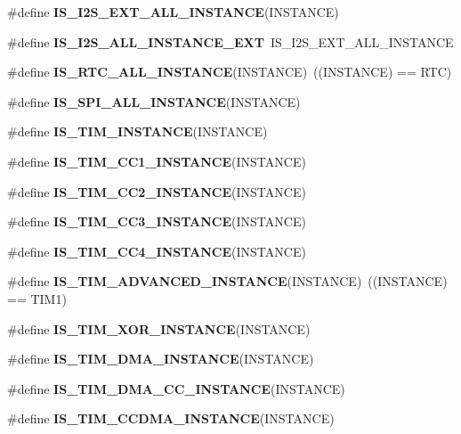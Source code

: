 \begin{DoxyCompactItemize}
\#define {\bfseries I\+S\+\_\+\+I2\+S\+\_\+\+E\+X\+T\+\_\+\+A\+L\+L\+\_\+\+I\+N\+S\+T\+A\+N\+CE}(I\+N\+S\+T\+A\+N\+CE)
\item 
\mbox{\label{group___exported__macros_ga839b019f23ec240da66dd50a21ab5025}} 
\#define {\bfseries I\+S\+\_\+\+I2\+S\+\_\+\+A\+L\+L\+\_\+\+I\+N\+S\+T\+A\+N\+C\+E\+\_\+\+E\+XT}~I\+S\+\_\+\+I2\+S\+\_\+\+E\+X\+T\+\_\+\+A\+L\+L\+\_\+\+I\+N\+S\+T\+A\+N\+CE
\item 
\mbox{\label{group___exported__macros_gab4230e8bd4d88adc4250f041d67375ce}} 
\#define {\bfseries I\+S\+\_\+\+R\+T\+C\+\_\+\+A\+L\+L\+\_\+\+I\+N\+S\+T\+A\+N\+CE}(I\+N\+S\+T\+A\+N\+CE)~((I\+N\+S\+T\+A\+N\+CE) == R\+TC)
\item 
\#define {\bfseries I\+S\+\_\+\+S\+P\+I\+\_\+\+A\+L\+L\+\_\+\+I\+N\+S\+T\+A\+N\+CE}(I\+N\+S\+T\+A\+N\+CE)
\item 
\#define {\bfseries I\+S\+\_\+\+T\+I\+M\+\_\+\+I\+N\+S\+T\+A\+N\+CE}(I\+N\+S\+T\+A\+N\+CE)
\item 
\#define {\bfseries I\+S\+\_\+\+T\+I\+M\+\_\+\+C\+C1\+\_\+\+I\+N\+S\+T\+A\+N\+CE}(I\+N\+S\+T\+A\+N\+CE)
\item 
\#define {\bfseries I\+S\+\_\+\+T\+I\+M\+\_\+\+C\+C2\+\_\+\+I\+N\+S\+T\+A\+N\+CE}(I\+N\+S\+T\+A\+N\+CE)
\item 
\#define {\bfseries I\+S\+\_\+\+T\+I\+M\+\_\+\+C\+C3\+\_\+\+I\+N\+S\+T\+A\+N\+CE}(I\+N\+S\+T\+A\+N\+CE)
\item 
\#define {\bfseries I\+S\+\_\+\+T\+I\+M\+\_\+\+C\+C4\+\_\+\+I\+N\+S\+T\+A\+N\+CE}(I\+N\+S\+T\+A\+N\+CE)
\item 
\mbox{\label{group___exported__macros_ga7e85353dbe9dc9d80ad06f0b935c12e1}} 
\#define {\bfseries I\+S\+\_\+\+T\+I\+M\+\_\+\+A\+D\+V\+A\+N\+C\+E\+D\+\_\+\+I\+N\+S\+T\+A\+N\+CE}(I\+N\+S\+T\+A\+N\+CE)~((I\+N\+S\+T\+A\+N\+CE) == T\+I\+M1)
\item 
\#define {\bfseries I\+S\+\_\+\+T\+I\+M\+\_\+\+X\+O\+R\+\_\+\+I\+N\+S\+T\+A\+N\+CE}(I\+N\+S\+T\+A\+N\+CE)
\item 
\#define {\bfseries I\+S\+\_\+\+T\+I\+M\+\_\+\+D\+M\+A\+\_\+\+I\+N\+S\+T\+A\+N\+CE}(I\+N\+S\+T\+A\+N\+CE)
\item 
\#define {\bfseries I\+S\+\_\+\+T\+I\+M\+\_\+\+D\+M\+A\+\_\+\+C\+C\+\_\+\+I\+N\+S\+T\+A\+N\+CE}(I\+N\+S\+T\+A\+N\+CE)
\item 
\#define {\bfseries I\+S\+\_\+\+T\+I\+M\+\_\+\+C\+C\+D\+M\+A\+\_\+\+I\+N\+S\+T\+A\+N\+CE}(I\+N\+S\+T\+A\+N\+CE)

\end{DoxyCompactItemize}
